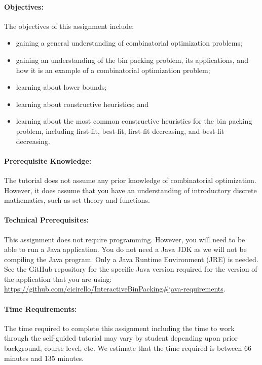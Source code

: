 \documentclass[11pt,letterpaper]{article}
\begin{document}
\paragraph*{Objectives:} The objectives of this assignment include:
\begin{itemize}[leftmargin=*, parsep=0pt, itemsep=2pt, topsep=2pt]
\item gaining a general understanding of combinatorial optimization problems;
\item gaining an understanding of the bin packing problem, its 
applications, and how it is an example of a combinatorial 
optimization problem;
\item learning about lower bounds;
\item learning about constructive heuristics; and
\item learning about the most common constructive heuristics 
for the bin packing problem, including first-fit, best-fit, 
first-fit decreasing, and best-fit decreasing.
\end{itemize}

\paragraph*{Prerequisite Knowledge:} The tutorial does not assume
any prior knowledge of combinatorial optimization. However, it does 
assume that you have an understanding of introductory discrete mathematics,
such as set theory and functions.

\paragraph*{Technical Prerequisites:} This assignment does not require
programming. However, you will need to be able to run a Java application.
You do not need a Java JDK as we will not be compiling the Java program. 
Only a Java Runtime Environment (JRE) is needed. See the GitHub repository
for the specific Java version required for the version of the application
that you are using: \url{https://github.com/cicirello/InteractiveBinPacking#java-requirements}.

\paragraph*{Time Requirements:} The time required to complete this assignment
including the time to work through the self-guided tutorial may vary by
student depending upon prior background, course level, etc. We estimate that
the time required is between 66 minutes and 135 minutes.
\end{document}
